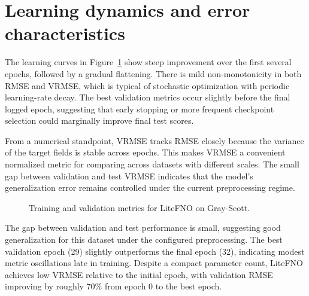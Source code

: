\documentclass[11pt]{article}
\begin{document}
\section{Learning dynamics and error characteristics}
The learning curves in Figure~\ref{fig:learning-curves} show steep improvement
over the first several epochs, followed by a gradual flattening. There is mild
non-monotonicity in both RMSE and VRMSE, which is typical of stochastic
optimization with periodic learning-rate decay. The best validation metrics
occur slightly before the final logged epoch, suggesting that early stopping or
more frequent checkpoint selection could marginally improve final test scores.

From a numerical standpoint, VRMSE tracks RMSE closely because the variance of
the target fields is stable across epochs. This makes VRMSE a convenient
normalized metric for comparing across datasets with different scales. The
small gap between validation and test VRMSE indicates that the model's
generalization error remains controlled under the current preprocessing regime.

\begin{figure}[t]
  \centering
  \caption{Training and validation metrics for LiteFNO on Gray-Scott.}
  \label{fig:learning-curves}
\end{figure}

The gap between validation and test performance is small, suggesting good
generalization for this dataset under the configured preprocessing. The best
validation epoch (29) slightly outperforms the final epoch (32), indicating
modest metric oscillations late in training. Despite a compact parameter count,
LiteFNO achieves low VRMSE relative to the initial epoch, with validation RMSE
improving by roughly 70\% from epoch 0 to the best epoch.
\end{document}
